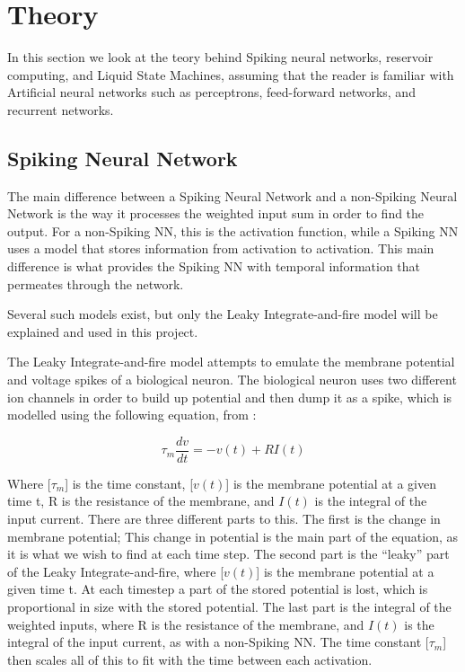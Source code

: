 \chapter{Theory}

In this section we look at the teory behind Spiking neural networks, reservoir computing, and Liquid State Machines, assuming that the reader is familiar with Artificial neural networks such as perceptrons, feed-forward networks, and recurrent networks.

\section{Spiking Neural Network}

The main difference between a Spiking Neural Network and a non-Spiking Neural Network is the way it processes the weighted input sum in order to find the output. For a non-Spiking NN, this is the activation function, while a Spiking NN uses a model that stores information from activation to activation. This main difference is what provides the Spiking NN with temporal information that permeates through the network.

Several such models exist, but only the Leaky Integrate-and-fire model \cite{Leaky} will be explained and used in this project. %

The Leaky Integrate-and-fire model attempts to emulate the membrane potential and voltage spikes of a biological neuron. The biological neuron uses two different ion channels in order to build up potential and then dump it as a spike, which is modelled using the following equation, from \cite{leaky}:

\begin{equation}
\tau_m\frac{dv}{dt} = -v(t) + RI(t)
\end{equation}

Where [$\tau_m$] is the time constant, [$v(t)$] is the membrane potential at a given time t, R is the resistance of the membrane, and $I(t)$ is the integral of the input current.
There are three different parts to this. The first is the change in membrane potential; This change in potential is the main part of the equation, as it is what we wish to find at each time step. The second part is the ``leaky'' part of the Leaky Integrate-and-fire, where [$v(t)$] is the membrane potential at a given time t. At each timestep a part of the stored potential is lost, which is proportional in size with the stored potential. The last part is the integral of the weighted inputs, where R is the resistance of the membrane, and $I(t)$ is the integral of the input current, as with a non-Spiking NN. The time constant [$\tau_m$] then scales all of this to fit with the time between each activation.

